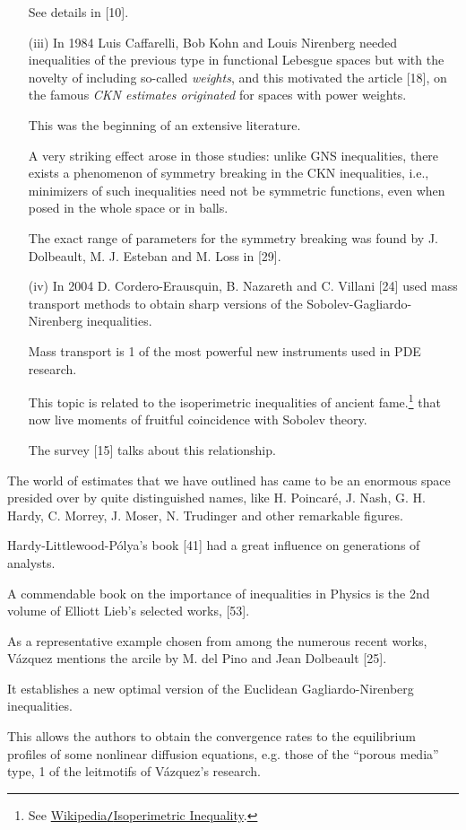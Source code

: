 \documentclass{article}
\begin{document}
\begin{itemize}
	See details in [10].
	\item[(iii)] In 1984 Luis Caffarelli, Bob Kohn and Louis Nirenberg needed inequalities of the previous type in functional Lebesgue spaces but with the novelty of including so-called \textit{weights}, and this motivated the article [18], on the famous \textit{CKN estimates originated} for spaces with power weights.
	
	This was the beginning of an extensive literature.
	
	A very striking effect arose in those studies: unlike GNS inequalities, there exists a phenomenon of symmetry breaking in the CKN inequalities, i.e., minimizers of such inequalities need not be symmetric functions, even when posed in the whole space or in balls.
	
	The exact range of parameters for the symmetry breaking was found by J. Dolbeault, M. J. Esteban and M. Loss in [29].
	\item[(iv)] In 2004 D. Cordero-Erausquin, B. Nazareth and C. Villani [24] used mass transport methods to obtain sharp versions of the Sobolev-Gagliardo-Nirenberg inequalities.
	
	Mass transport is 1 of the most powerful new instruments used in PDE research.
	
	This topic is related to the isoperimetric inequalities of ancient fame.\footnote{See \href{https://en.wikipedia.org/wiki/Isoperimetric-inequality}{Wikipedia{\tt/}Isoperimetric Inequality}.} that now live moments of fruitful coincidence with Sobolev theory.
	
	The survey [15] talks about this relationship.
\end{itemize}
The world of estimates that we have outlined has came to be an enormous space presided over by quite distinguished names, like H. Poincar\'e, J. Nash, G. H. Hardy, C. Morrey, J. Moser, N. Trudinger and other remarkable figures.

Hardy-Littlewood-P\'olya's book [41] had a great influence on generations of analysts.

A commendable book on the importance of inequalities in Physics is the 2nd volume of Elliott Lieb's selected works, [53].

%
As a representative example chosen from among the numerous recent works, V\'azquez mentions the arcile by M. del Pino and Jean Dolbeault [25].

It establishes a new optimal version of the Euclidean Gagliardo-Nirenberg inequalities.

This allows the authors to obtain the convergence rates to the equilibrium profiles of some nonlinear diffusion equations, e.g. those of the ``porous media'' type, 1 of the leitmotifs of V\'azquez's research.
\end{document}
